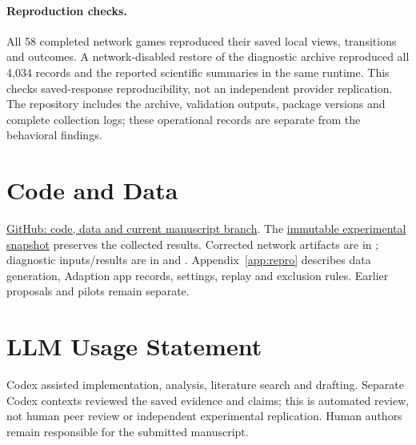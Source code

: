 \documentclass[11pt]{article}
\begin{document}
\paragraph{Reproduction checks.}
All 58 completed network games reproduced their saved local views, transitions and outcomes. A network-disabled restore of the diagnostic archive reproduced all 4,034 records and the reported scientific summaries in the same runtime. This checks saved-response reproducibility, not an independent provider replication. The repository includes the archive, validation outputs, package versions and complete collection logs; these operational records are separate from the behavioral findings.

\section*{Code and Data}
\href{https://github.com/nhat117/AdoptionAIHackathon/tree/codex/two-research-proposals}{GitHub: code, data and current manuscript branch}. The \href{https://github.com/nhat117/AdoptionAIHackathon/tree/a0db95c}{immutable experimental snapshot} preserves the collected results. Corrected network artifacts are in ; diagnostic inputs/results are in  and . Appendix~\ref{app:repro} describes data generation, Adaption app records, settings, replay and exclusion rules. Earlier proposals and pilots remain separate.

\section*{LLM Usage Statement}
Codex assisted implementation, analysis, literature search and drafting. Separate Codex contexts reviewed the saved evidence and claims; this is automated review, not human peer review or independent experimental replication. Human authors remain responsible for the submitted manuscript.
\end{document}
